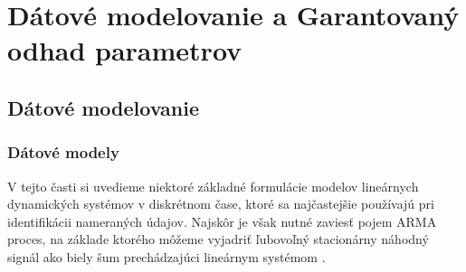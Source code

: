 \part{Dátové modelovanie a Garantovaný odhad parametrov}
\chapter{Dátové modelovanie}


\section{Dátové modely}
V tejto časti si uvedieme niektoré základné formulácie modelov lineárnych dynamických systémov v diskrétnom čase, ktoré sa najčastejšie používajú pri identifikácii nameraných údajov. Najskôr je však nutné zaviesť pojem ARMA proces, na základe ktorého môžeme vyjadriť ľubovoľný stacionárny náhodný signál ako biely šum prechádzajúci lineárnym systémom \cite{fikar:identifikacia:1999}.

